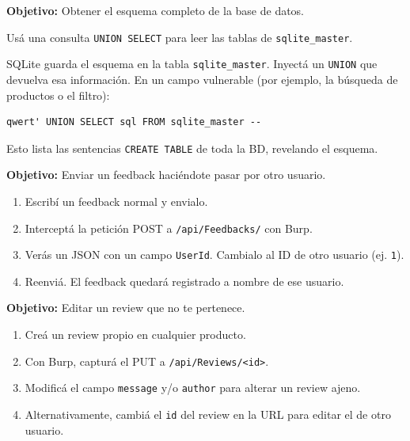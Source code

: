 \documentclass[11pt,a4paper]{article}
\begin{document}
\begin{desafio}
\textbf{Objetivo:} Obtener el esquema completo de la base de datos.
\begin{pista}
Usá una consulta \texttt{UNION SELECT} para leer las tablas de \texttt{sqlite\_master}.
\end{pista}
\begin{solucion}
SQLite guarda el esquema en la tabla \texttt{sqlite\_master}. Inyectá un \texttt{UNION} que devuelva esa información. En un campo vulnerable (por ejemplo, la búsqueda de productos o el filtro):
\begin{lstlisting}
qwert' UNION SELECT sql FROM sqlite_master --
\end{lstlisting}
Esto lista las sentencias \texttt{CREATE TABLE} de toda la BD, revelando el esquema.
\end{solucion}
\end{desafio}

\begin{desafio}
\textbf{Objetivo:} Enviar un feedback haciéndote pasar por otro usuario.
\begin{solucion}
\begin{enumerate}[leftmargin=*]
  \item Escribí un feedback normal y envialo.
  \item Interceptá la petición POST a \texttt{/api/Feedbacks/} con Burp.
  \item Verás un JSON con un campo \texttt{UserId}. Cambialo al ID de otro usuario (ej. \texttt{1}).
  \item Reenviá. El feedback quedará registrado a nombre de ese usuario.
\end{enumerate}
\end{solucion}
\end{desafio}

\begin{desafio}
\textbf{Objetivo:} Editar un review que no te pertenece.
\begin{solucion}
\begin{enumerate}[leftmargin=*]
  \item Creá un review propio en cualquier producto.
  \item Con Burp, capturá el PUT a \texttt{/api/Reviews/<id>}.
  \item Modificá el campo \texttt{message} y/o \texttt{author} para alterar un review ajeno.
  \item Alternativamente, cambiá el \texttt{id} del review en la URL para editar el de otro usuario.
\end{enumerate}
\end{solucion}
\end{desafio}
\end{document}
